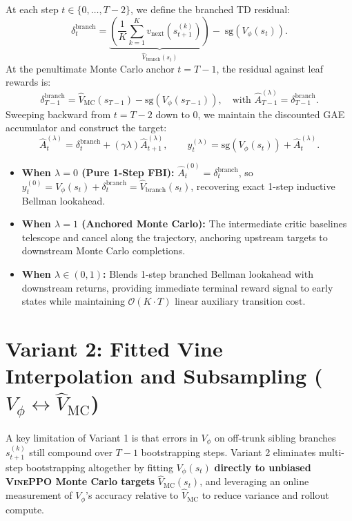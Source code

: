 \documentclass[11pt,a4paper]{article}
\newcommand{\sg}{\text{sg}}
\newcommand{\Vmc}{\hat{V}_{\text{MC}}}
\begin{document}
At each step $t \in \{0, \dots, T - 2\}$, we define the branched TD residual:
\begin{equation}
    \delta_t^{\text{branch}} = \underbrace{\left(\frac{1}{K} \sum_{k=1}^K v_{\text{next}}\!\left(s_{t+1}^{(k)}\right)\right)}_{\hat{V}_{\text{branch}}(s_t)} - \; \sg\!\left(V_\phi(s_t)\right).
    \label{eq:delta_branch}
\end{equation}
At the penultimate Monte Carlo anchor $t = T - 1$, the residual against leaf rewards is:
\begin{equation}
    \delta_{T-1}^{\text{branch}} = \Vmc(s_{T-1}) - \sg\!\left(V_\phi(s_{T-1})\right), \quad \text{with } \hat{A}_{T-1}^{(\lambda)} = \delta_{T-1}^{\text{branch}}.
\end{equation}
Sweeping backward from $t = T - 2$ down to $0$, we maintain the discounted GAE accumulator and construct the target:
\begin{equation}
    \hat{A}_t^{(\lambda)} = \delta_t^{\text{branch}} + (\gamma \lambda) \hat{A}_{t+1}^{(\lambda)}, \qquad
    y_t^{(\lambda)} = \sg\!\left(V_\phi(s_t)\right) + \hat{A}_t^{(\lambda)}.
    \label{eq:fbi_lambda_gae}
\end{equation}
\begin{itemize}
    \item \textbf{When $\lambda = 0$ (Pure 1-Step FBI):} $\hat{A}_t^{(0)} = \delta_t^{\text{branch}}$, so $y_t^{(0)} = V_\phi(s_t) + \delta_t^{\text{branch}} = \hat{V}_{\text{branch}}(s_t)$, recovering exact 1-step inductive Bellman lookahead.
    \item \textbf{When $\lambda = 1$ (Anchored Monte Carlo):} The intermediate critic baselines telescope and cancel along the trajectory, anchoring upstream targets to downstream Monte Carlo completions.
    \item \textbf{When $\lambda \in (0, 1)$:} Blends 1-step branched Bellman lookahead with downstream returns, providing immediate terminal reward signal to early states while maintaining $\mathcal{O}(K \cdot T)$ linear auxiliary transition cost.
\end{itemize}

\section{\texorpdfstring{Variant 2: Fitted Vine Interpolation and Subsampling ($V_\phi \leftrightarrow \Vmc$)}{Variant 2: Fitted Vine Interpolation and Subsampling}}
\label{sec:fitted_vine}

A key limitation of Variant 1 is that errors in $V_\phi$ on off-trunk sibling branches $s_{t+1}^{(k)}$ still compound over $T - 1$ bootstrapping steps. Variant 2 eliminates multi-step bootstrapping altogether by fitting $V_\phi(s_t)$ \textbf{directly to unbiased \textsc{VinePPO} Monte Carlo targets} $\Vmc(s_t)$, and leveraging an online measurement of $V_\phi$'s accuracy relative to $\Vmc$ to reduce variance and rollout compute.
\end{document}
